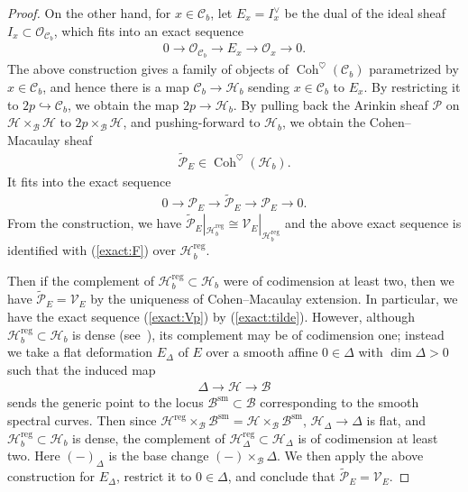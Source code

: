 \documentclass[11pt,oneside,a4paper,mathscr]{amsart}
\theoremstyle{definition}
\newcommand{\cH}{\mathcal{H}}
\newcommand{\cB}{\mathcal{B}}
\newcommand{\cC}{\mathcal{C}}
\newcommand{\cP}{\mathcal{P}}
\newcommand{\cO}{\mathcal{O}}
\newcommand{\Coh}{\operatorname{Coh}}
\begin{document}
\begin{proof}
On the other hand, for $x\in \cC_b$, let $E_x=I_x^{\vee}$ be the dual of the ideal sheaf $I_x \subset \cO_{\cC_b}$, which fits into 
an exact sequence 
    \begin{align*}
        0\to \mathcal{O}_{\cC_b} \to E_x \to \mathcal{O}_x \to 0.
    \end{align*}
    The above construction gives a family of objects of $\Coh^{\heartsuit}(\cC_b)$ parametrized by $x\in \cC_b$, 
    and hence there is a map $\cC_b \to \cH_b$ sending $x\in \cC_b$ to $E_x$. By restricting it to $2p \hookrightarrow \cC_b$, we obtain the map $2p \to \cH_b$. By pulling back the Arinkin sheaf $\cP$ on 
    $\cH\times_{\cB} \cH$ to $2p \times_{\cB}\cH$, and pushing-forward to $\cH_b$, we obtain the Cohen--Macaulay sheaf 
    \begin{align*}
        \widetilde{\cP}_E \in \Coh^{\heartsuit}(\cH_b). 
    \end{align*}
    It fits into the exact sequence 
    \begin{align}\label{exact:tilde}
        0\to \cP_E \to \widetilde{\cP}_E \to \cP_E \to 0.
    \end{align}
   From the construction, we have $\widetilde{\cP}_E|_{\cH_b^{\mathrm{reg}}}\cong \mathcal{V}_E|_{\cH_b^{\mathrm{reg}}}$
   and the above exact sequence is identified with (\ref{exact:F}) over $\cH_b^{\mathrm{reg}}$. 

   Then if the complement of $\cH_b^{\mathrm{reg}} \subset \cH_b$ were of codimension at least two, then 
   we have $\widetilde{\cP}_E=\mathcal{V}_E$ by the uniqueness of Cohen--Macaulay extension. In particular, we have the exact sequence (\ref{exact:Vp}) by (\ref{exact:tilde}). 
   However, although $\cH_b^{\mathrm{reg}} \subset \cH_b$ is dense (see~\cite[Remark~2.5]{TodaGL2}), its complement may be of codimension one; instead we take a flat deformation $E_{\Delta}$
of $E$ over a smooth affine $0\in \Delta$ with $\dim \Delta>0$ such that the induced map 
\begin{align*}\Delta \to \cH \to \cB
\end{align*}
sends the generic point to the locus $\cB^{\mathrm{sm}} \subset \cB$ corresponding to the smooth 
spectral curves. Then since $\cH^{\mathrm{reg}}\times_{\cB}\cB^{\mathrm{sm}}=\cH\times_{\cB}\cB^{\mathrm{sm}}$, $\cH_{\Delta}\to \Delta$ is flat, and $\cH_b^{\mathrm{reg}} \subset \cH_b$ is dense, 
the complement of $\cH_{\Delta}^{\mathrm{reg}} \subset \cH_{\Delta}$ is of codimension 
at least two. Here $(-)_{\Delta}$ is the base change $(-)\times_{\cB}\Delta$. 
We then apply the above construction for 
$E_{\Delta}$, restrict it to $0\in \Delta$, and conclude that $\widetilde{\cP}_E=\mathcal{V}_E$.
    \end{proof}
\end{document}
